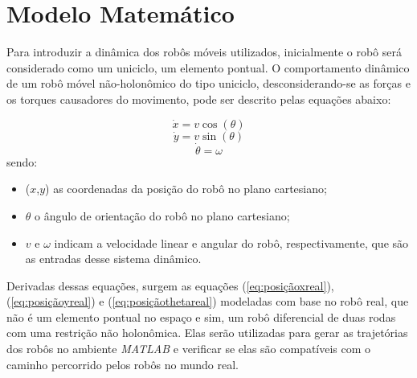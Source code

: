 \section{Modelo Matemático}
\label{sec:modMatematico}
Para introduzir a dinâmica dos robôs móveis utilizados, inicialmente o robô será considerado como um uniciclo, um elemento pontual. O comportamento dinâmico de um robô móvel não-holonômico do tipo uniciclo, desconsiderando-se as forças e os torques causadores do movimento, pode ser descrito pelas equações abaixo:

\begin{equation}
	\dot{x} = v\cos(\theta) 
	\label{eq:posiçãox}
\end{equation}
\begin{equation}
	\dot{y} = v\sin(\theta)
	\label{eq:posiçãoy}
\end{equation}
\begin{equation}
	\dot{\theta} = \omega
	\label{eq:posiçãotheta}
\end{equation}
sendo:
\begin{itemize}
	\item ($x$,$y$) as coordenadas da posição do robô no plano cartesiano;
	\item $\theta$ o ângulo de orientação do robô no plano cartesiano;
	\item $v$ e $\omega$ indicam a velocidade linear e angular do robô, respectivamente, que são as entradas desse sistema dinâmico.	
\end{itemize}

Derivadas dessas equações, surgem as equações (\ref{eq:posiçãoxreal}), (\ref{eq:posiçãoyreal}) e (\ref{eq:posiçãothetareal}) modeladas com base no robô real, que não é um elemento pontual no espaço e sim, um robô diferencial de duas rodas com uma restrição não holonômica. Elas serão utilizadas para gerar as trajetórias dos robôs no ambiente \emph{MATLAB\textregistered} e verificar se elas são compatíveis com o caminho percorrido pelos robôs no mundo real. 

